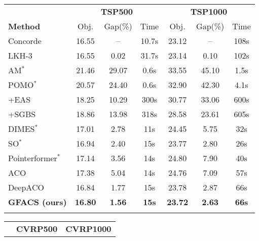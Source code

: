 \documentclass{article}
\begin{document}

\begin{table}[H]
\centering
\footnotesize
\setlength{\tabcolsep}{2pt}
\renewcommand{\arraystretch}{1.2}

\noindent
\begin{minipage}[t]{0.49\textwidth}
\vspace*{0pt}
\centering
\begin{tabular}{l ccc ccc}
\Xhline{1pt}
& \multicolumn{3}{c}{\textbf{TSP500}} & \multicolumn{3}{c}{\textbf{TSP1000}}\\
\cline{2-7}
\textbf{Method} & Obj. & Gap(\%) & Time & Obj. & Gap(\%) & Time \\
\hline
Concorde           & 16.55 & --    & 10.7s & 23.12 & --   & 108s \\
LKH-3              & 16.55 & 0.02  & 31.7s & 23.14 & 0.10 & 102s \\
\hline
AM$^*$             & 21.46 & 29.07 & 0.6s & 33.55 & 45.10 & 1.5s \\
POMO$^*$           & 20.57 & 24.40 & 0.6s & 32.90 & 42.30 & 4.1s \\
\quad +EAS         & 18.25 & 10.29 & 300s & 30.77 & 33.06 & 600s \\
\quad +SGBS        & 18.86 & 13.98 & 318s & 28.58 & 23.61 & 605s \\
DIMES$^*$          & 17.01 & 2.78  & 11s  & 24.45 & 5.75  & 32s \\
SO$^*$             & 16.94 & 2.40  & 15s  & 23.77 & 2.80  & 26s \\
Pointerformer$^*$  & 17.14 & 3.56  & 14s  & 24.80 & 7.90  & 40s \\
\hline
ACO                & 17.38 & 5.04 & 14s & 24.76 & 7.09 & 57s \\
DeepACO            & 16.84 & 1.77 & 15s & 23.78 & 2.87 & 66s \\
\textbf{GFACS (ours)} & \textbf{16.80} & \textbf{1.56} & \textbf{15s} &
\textbf{23.72} & \textbf{2.63} & \textbf{66s} \\
\Xhline{1pt}
\end{tabular}
\end{minipage}
\hfill
\begin{minipage}[t]{0.49\textwidth}
\vspace*{0pt}
\centering
\begin{tabular}{l ccc ccc}
\Xhline{1pt}
& \multicolumn{3}{c}{\textbf{CVRP500}} & \multicolumn{3}{c}{\textbf{CVRP1000}}\\

\end{tabular}
\end{minipage}
\end{table}
\end{document}
